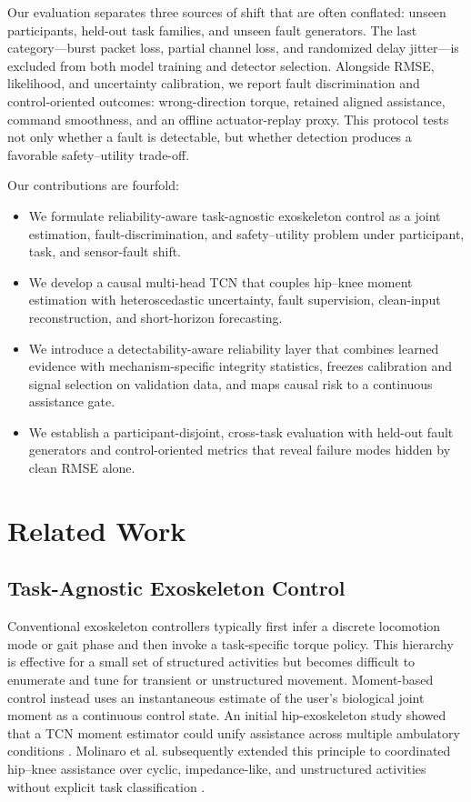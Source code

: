 \documentclass[letterpaper]{article} %
\begin{document}
Our evaluation separates three sources of shift that are often conflated: unseen participants, held-out task families, and unseen fault generators.
The last category---burst packet loss, partial channel loss, and randomized delay jitter---is excluded from both model training and detector selection.
Alongside RMSE, likelihood, and uncertainty calibration, we report fault discrimination and control-oriented outcomes: wrong-direction torque, retained aligned assistance, command smoothness, and an offline actuator-replay proxy.
This protocol tests not only whether a fault is detectable, but whether detection produces a favorable safety--utility trade-off.

Our contributions are fourfold:
\begin{itemize}
    \item We formulate reliability-aware task-agnostic exoskeleton control as a joint estimation, fault-discrimination, and safety--utility problem under participant, task, and sensor-fault shift.
    \item We develop a causal multi-head TCN that couples hip--knee moment estimation with heteroscedastic uncertainty, fault supervision, clean-input reconstruction, and short-horizon forecasting.
    \item We introduce a detectability-aware reliability layer that combines learned evidence with mechanism-specific integrity statistics, freezes calibration and signal selection on validation data, and maps causal risk to a continuous assistance gate.
    \item We establish a participant-disjoint, cross-task evaluation with held-out fault generators and control-oriented metrics that reveal failure modes hidden by clean RMSE alone.
\end{itemize}

\section{Related Work}

\subsection{Task-Agnostic Exoskeleton Control}

Conventional exoskeleton controllers typically first infer a discrete locomotion mode or gait phase and then invoke a task-specific torque policy.
This hierarchy is effective for a small set of structured activities but becomes difficult to enumerate and tune for transient or unstructured movement.
Moment-based control instead uses an instantaneous estimate of the user's biological joint moment as a continuous control state.
An initial hip-exoskeleton study showed that a TCN moment estimator could unify assistance across multiple ambulatory conditions \citep{molinaro2024unifies}.
Molinaro et al. subsequently extended this principle to coordinated hip--knee assistance over cyclic, impedance-like, and unstructured activities without explicit task classification \citep{molinaro2024task}.
\end{document}

